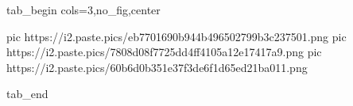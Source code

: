 
 
 
 
 


\ifcmt
  tab_begin cols=3,no_fig,center

     pic https://i2.paste.pics/eb7701690b944b496502799b3c237501.png
		 pic https://i2.paste.pics/7808d08f7725dd4ff4105a12e17417a9.png
		 pic https://i2.paste.pics/60b6d0b351e37f3de6f1d65ed21ba011.png

  tab_end
\fi
